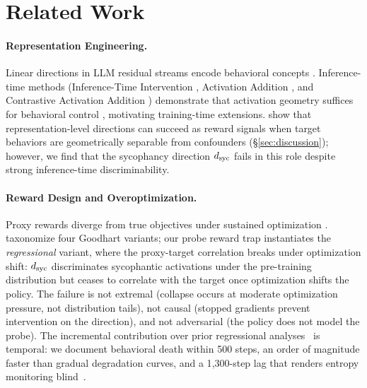 \section{Related Work}\label{sec:related_work}

\paragraph{Representation Engineering.}
Linear directions in LLM residual streams encode behavioral concepts \citep{zou2023repe, marks2024geometry}.
Inference-time methods (Inference-Time Intervention \citep[ITI;][]{li2023iti}, Activation Addition \citep[ActAdd;][]{turner2023actadd}, and Contrastive Activation Addition \citep[CAA;][]{rimsky2024caa}) demonstrate that activation geometry suffices for behavioral control \citep{burns2023ccs}, motivating training-time extensions.
\citet{wu2026rewardhacking} show that representation-level directions can succeed as reward signals when target behaviors are geometrically separable from confounders (\S\ref{sec:discussion}); however, we find that the sycophancy direction $d_{\text{syc}}$ fails in this role despite strong inference-time discriminability.

\paragraph{Reward Design and Overoptimization.}
Proxy rewards diverge from true objectives under sustained optimization \citep{gao2023scaling, pan2022effects}.
\citet{manheim2019goodhart} taxonomize four Goodhart variants; our probe reward trap instantiates the \emph{regressional} variant, where the proxy-target correlation breaks under optimization shift: $d_{\text{syc}}$ discriminates sycophantic activations under the pre-training distribution but ceases to correlate with the target once optimization shifts the policy.
The failure is not extremal (collapse occurs at moderate optimization pressure, not distribution tails), not causal (stopped gradients prevent intervention on the direction), and not adversarial (the policy does not model the probe).
The incremental contribution over prior regressional analyses~\citep{gao2023scaling} is temporal: we document behavioral death within 500 steps, an order of magnitude faster than gradual degradation curves, and a 1{,}300-step lag that renders entropy monitoring blind~\citep{skalse2022hacking}.

